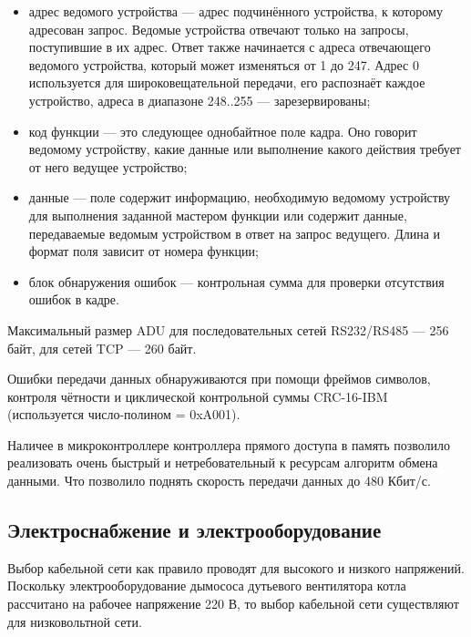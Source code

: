         \begin{itemize}
            \item адрес ведомого устройства — адрес подчинённого устройства, к
                которому адресован запрос. Ведомые устройства отвечают только
                на запросы, поступившие в их адрес. Ответ также начинается с
                адреса отвечающего ведомого устройства, который может
                изменяться от 1 до 247. Адрес 0 используется для
                широковещательной передачи, его распознаёт каждое устройство,
                адреса в диапазоне 248..255 — зарезервированы; 
            \item код функции — это следующее однобайтное поле кадра. Оно
                говорит ведомому устройству, какие данные или выполнение какого
                действия требует от него ведущее устройство; 
            \item данные — поле содержит информацию, необходимую ведомому
                устройству для выполнения заданной мастером функции или
                содержит данные, передаваемые ведомым устройством в ответ на
                запрос ведущего.  Длина и формат поля зависит от номера
                функции;
            \item блок обнаружения ошибок — контрольная сумма для проверки
                отсутствия ошибок в кадре.
        \end{itemize}

        Максимальный размер ADU для последовательных сетей RS232/RS485 — 256
        байт, для сетей TCP — 260 байт. 

        Ошибки передачи данных обнаруживаются при помощи фреймов символов,
        контроля чётности и циклической контрольной суммы CRC-16-IBM
        (используется число-полином = 0xA001). 

        Наличее в микроконтроллере контроллера прямого доступа в память
        позволило реализовать очень быстрый и нетребовательный к ресурсам
        алгоритм обмена данными. Что позволило поднять скорость передачи данных
        до 480 Кбит/с.

    \subsection{Электроснабжение и электрооборудование}
        Выбор кабельной сети как правило проводят для высокого и низкого
        напряжений. Поскольку электрооборудование дымососа дутьевого
        вентилятора котла рассчитано на рабочее напряжение 220 В, то выбор
        кабельной сети существляют для низковольтной сети.

